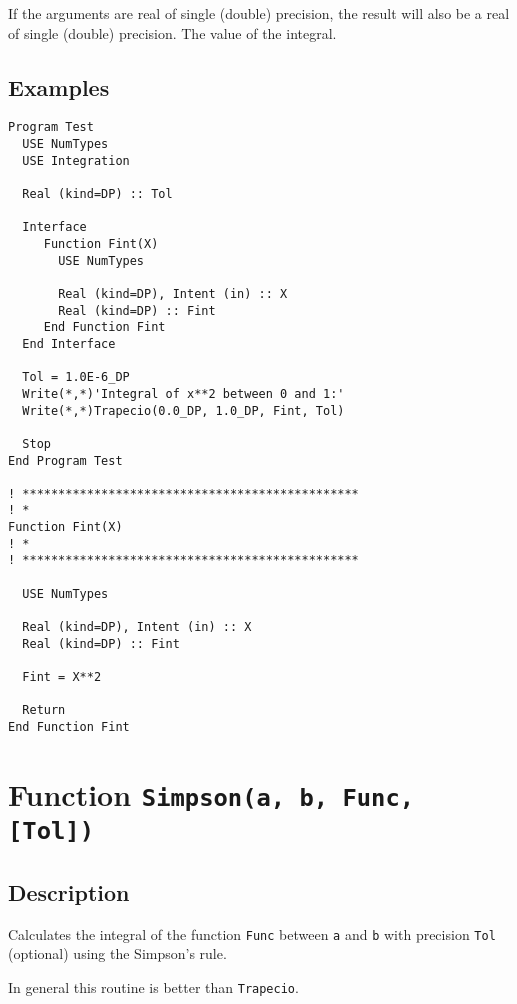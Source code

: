 If the arguments are real of single (double) precision, the result
will also be a real of single (double) precision. The value of the
integral. 


\subsection{Examples}

\begin{lstlisting}[emph=Trapecio,
                   emphstyle=\color{blue},
                   frame=trBL,
                   caption=Example of integration of a function using \texttt{Trpecio}.,
                   label=trapecio]
Program Test
  USE NumTypes
  USE Integration

  Real (kind=DP) :: Tol

  Interface 
     Function Fint(X)
       USE NumTypes

       Real (kind=DP), Intent (in) :: X
       Real (kind=DP) :: Fint
     End Function Fint
  End Interface

  Tol = 1.0E-6_DP
  Write(*,*)'Integral of x**2 between 0 and 1:'
  Write(*,*)Trapecio(0.0_DP, 1.0_DP, Fint, Tol)

  Stop
End Program Test

! ***********************************************
! *
Function Fint(X)
! *  
! ***********************************************

  USE NumTypes

  Real (kind=DP), Intent (in) :: X
  Real (kind=DP) :: Fint

  Fint = X**2

  Return
End Function Fint
\end{lstlisting}

\section{Function \texttt{Simpson(a, b, Func, [Tol])}}

\subsection{Description}

Calculates the integral of the function \texttt{Func} between
\texttt{a} and \texttt{b} with precision \texttt{Tol} (optional) using
the Simpson's rule.

In general this routine is better than \texttt{Trapecio}.


